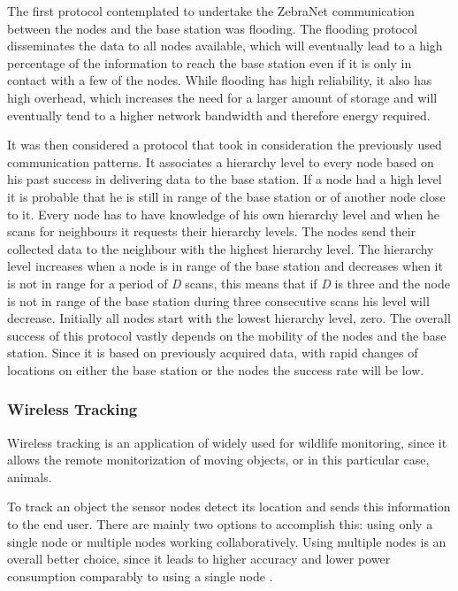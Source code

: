 The first protocol contemplated to undertake the ZebraNet communication between the nodes and
the base station was flooding. The flooding protocol disseminates the data to all nodes
available, which will eventually lead to a high percentage of the information to reach the
base station even if it is only in contact with a few of the nodes. While flooding has high
reliability, it also has high overhead, which increases the need for a larger amount of
storage and will eventually tend to a higher network bandwidth and therefore energy required.

It was then considered a protocol that took in consideration the previously used communication
patterns. It associates a hierarchy level to every node based on his past success in delivering
data to the base station. If a node had a high level it is probable that he is still in range
of the base station or of another node close to it. Every node has to have knowledge of his
own hierarchy level and when he scans for neighbours it requests their hierarchy levels. The
nodes send their collected data to the neighbour with the highest hierarchy level. The hierarchy
level increases when a node is in range of the base station and decreases when it is not in
range for a period of \textit{D} scans, this means that if \textit{D} is three and the node is
not in range of the base station during three consecutive scans his level will decrease.
Initially all nodes start with the lowest hierarchy level, zero. The overall success of this
protocol vastly depends on the mobility of the nodes and the base station. Since it is based
on previously acquired data, with rapid changes of locations on either the base station or
the nodes the success rate will be low.


\subsubsection{Wireless Tracking}
\label{subsubsection:wireless_tracking}
Wireless tracking is an application of  widely used for wildlife monitoring,
since it allows the remote monitorization of moving objects, or in this particular case,
animals.

To track an object the sensor nodes detect its location and sends this information to the end
user. There are mainly two options to accomplish this: using only a single node or multiple
nodes working collaboratively. Using multiple nodes is an overall better choice, since it leads
to higher accuracy and lower power consumption comparably to using a single node \cite{Ez2016}.


